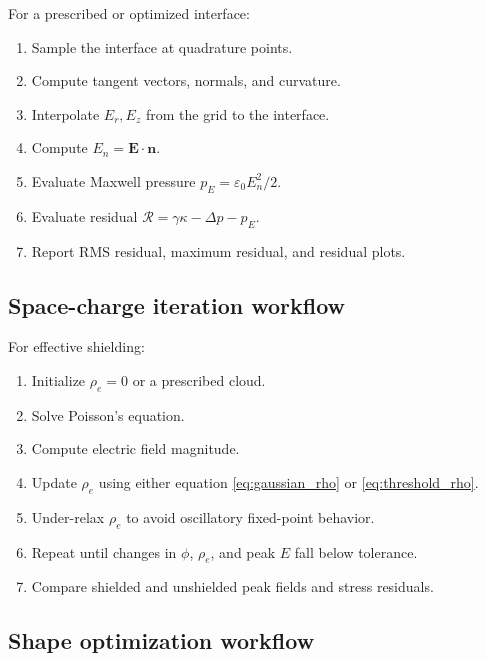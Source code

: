 \documentclass[11pt]{article}
\newcommand{\eps}{\varepsilon}
\newcommand{\vE}{\mathbf{E}}
\newcommand{\vn}{\mathbf{n}}
\begin{document}
For a prescribed or optimized interface:
\begin{enumerate}[label=\arabic*.]
    \item Sample the interface at quadrature points.
    \item Compute tangent vectors, normals, and curvature.
    \item Interpolate \(E_r,E_z\) from the grid to the interface.
    \item Compute \(E_n=\vE\cdot\vn\).
    \item Evaluate Maxwell pressure \(p_E=\eps_0E_n^2/2\).
    \item Evaluate residual \(\mathcal{R}=\gamma\kappa-\Delta p-p_E\).
    \item Report RMS residual, maximum residual, and residual plots.
\end{enumerate}

\subsection{Space-charge iteration workflow}

For effective shielding:
\begin{enumerate}[label=\arabic*.]
    \item Initialize \(\rho_e=0\) or a prescribed cloud.
    \item Solve Poisson's equation.
    \item Compute electric field magnitude.
    \item Update \(\rho_e\) using either equation \eqref{eq:gaussian_rho} or \eqref{eq:threshold_rho}.
    \item Under-relax \(\rho_e\) to avoid oscillatory fixed-point behavior.
    \item Repeat until changes in \(\phi\), \(\rho_e\), and peak \(E\) fall below tolerance.
    \item Compare shielded and unshielded peak fields and stress residuals.
\end{enumerate}

\subsection{Shape optimization workflow}
\end{document}
